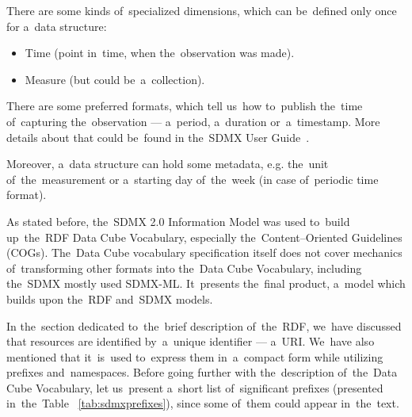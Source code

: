 There are some kinds of~specialized dimensions, which can be~defined only once
for a~data structure:

\begin{itemize}
\item Time (point in~time, when the~observation was made).
\item Measure (but could be~a~collection).
\end{itemize}

There are some preferred formats, which tell us~how to~publish the~time of~capturing
the~observation --- a~period, a~duration or~a~timestamp. More details about that could be~found
in the~SDMX User Guide~\cite{sdmxuserguide}.

Moreover, a~data structure can hold some metadata, e.g. the~unit of~the~measurement
or a~starting day of~the~week (in case of~periodic time format).

\begin{sloppypar}
As stated before, the~SDMX 2.0 Information Model was used to~build up~the~RDF
Data Cube Vocabulary, especially the~Content--Oriented Guidelines (COGs). The~Data Cube
vocabulary specification itself does not cover mechanics of~transforming other formats
into the~Data Cube Vocabulary, including the~SDMX mostly used SDMX-ML. It~presents the~final
product, a~model which builds upon the~RDF and~SDMX models.
\end{sloppypar}

In the~section dedicated to~the~brief description of~the~RDF, we~have discussed that resources
are identified by~a~unique identifier --- a~URI. We~have also mentioned that it~is~used to~express
them in~a~compact form while utilizing prefixes and~namespaces. Before going further with
the~description of~the~Data Cube Vocabulary, let us~present a~short list of~significant prefixes
(presented in~the~Table ~\ref{tab:sdmxprefixes}),
since some of~them could appear in~the~text.

